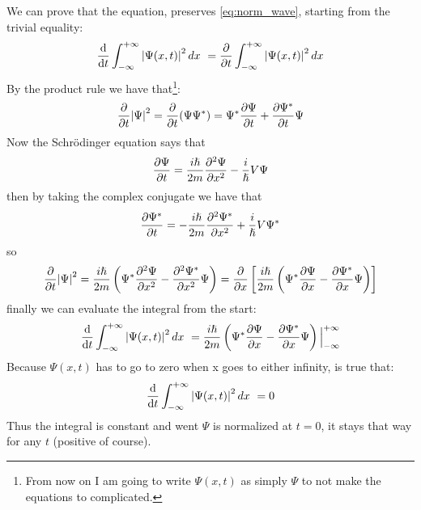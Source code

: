 We can prove that the equation, preserves \ref{eq:norm_wave}, starting from the trivial equality:
$$
\dv{t} \int_{-\infty}^{+\infty}\abs{\Psi(x,t)}^2\, dx\ = \pdv{t} \int_{-\infty}^{+\infty}\abs{\Psi(x,t)}^2\, dx
$$
By the product rule we have that\footnote{From now on I am going to write $\Psi(x,t)$ as simply $\Psi$ to not make the equations to complicated.}:
$$
\pdv{t}\abs{\Psi}^2 = \pdv{t}(\Psi\Psi^*) = \Psi^*\pdv{\Psi}{t} + \pdv{\Psi^*}{t}\Psi
$$
Now the Schrödinger equation says that 
$$
\pdv{\Psi}{t} = \frac{i\hslash}{2m}\pdv[2]{\Psi}{x} -  \frac{i}{\hslash}V\Psi
$$
then by taking the complex conjugate we have that 
$$
\pdv{\Psi^*}{t} = - \frac{i\hslash}{2m}\pdv[2]{\Psi^*}{x} + \frac{i}{\hslash}V\Psi^*
$$
so
$$
\pdv{t}\abs{\Psi}^2 = \frac{i\hslash}{2m} \left( \Psi^*\pdv[2]{\Psi}{x} - \pdv[2]{\Psi^*}{x}\Psi \right) = \pdv{x} \left[ \frac{i\hslash}{2m} \left(\Psi^*\pdv{\Psi}{x} - \pdv{\Psi^*}{x}\Psi\right)\right]
$$
finally we can evaluate the integral from the start:
$$
\dv{t} \int_{-\infty}^{+\infty}\abs{\Psi(x,t)}^2\, dx\ = \frac{i\hslash}{2m} \left( \Psi^*\pdv{\Psi}{x} - \pdv{\Psi^*}{x}\Psi \right) \Big|_{-\infty}^{+\infty}
$$
Because $\Psi(x,t)$ has to go to zero when x goes to either infinity, is true that:
$$
\dv{t} \int_{-\infty}^{+\infty}\abs{\Psi(x,t)}^2\, dx\ = 0
$$
Thus the integral is constant and went $\Psi$ is normalized at $t=0$, it stays that way for any $t$ (positive of course). 

